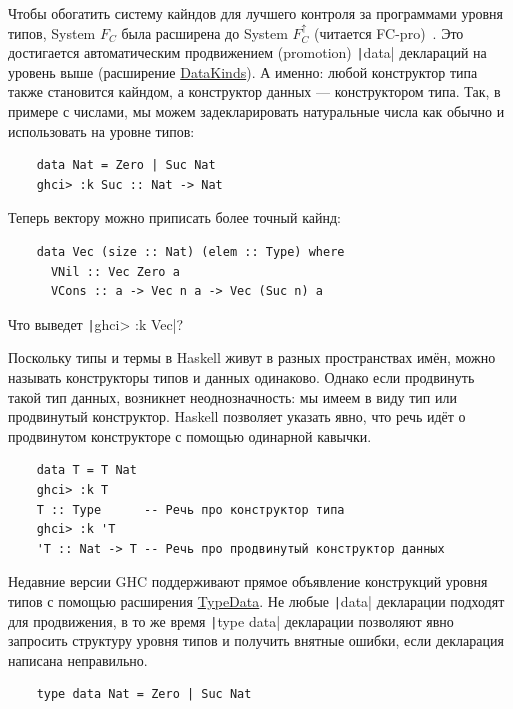 Чтобы обогатить систему кайндов для лучшего контроля за программами уровня типов, System $F_C$ была расширена до System $F_C^\uparrow$ (читается FC-pro)~\cite{yorgey2012giving}.
Это достигается автоматическим продвижением (promotion) \texttt|data| деклараций на уровень выше (расширение \href{https://downloads.haskell.org/ghc/latest/docs/users_guide/exts/data_kinds.html#extension-DataKinds}{DataKinds}).
А именно: любой конструктор типа также становится кайндом, а конструктор данных --- конструктором типа.
Так, в примере с числами, мы можем задекларировать натуральные числа как обычно и использовать на уровне типов:
\begin{verbatim}
    data Nat = Zero | Suc Nat
    ghci> :k Suc :: Nat -> Nat
\end{verbatim}

Теперь вектору можно приписать более точный кайнд:
\begin{verbatim}
    data Vec (size :: Nat) (elem :: Type) where
      VNil :: Vec Zero a
      VCons :: a -> Vec n a -> Vec (Suc n) a
\end{verbatim}

\begin{task}
    Что выведет \texttt|ghci> :k Vec|?
\end{task}

Поскольку типы и термы в Haskell живут в разных пространствах имён, можно называть конструкторы типов и данных одинаково.
Однако если продвинуть такой тип данных, возникнет неоднозначность: мы имеем в виду тип или продвинутый конструктор.
Haskell позволяет указать явно, что речь идёт о продвинутом конструкторе с помощью одинарной кавычки.
\begin{verbatim}
    data T = T Nat
    ghci> :k T
    T :: Type      -- Речь про конструктор типа
    ghci> :k 'T
    'T :: Nat -> T -- Речь про продвинутый конструктор данных
\end{verbatim}

Недавние версии GHC поддерживают прямое объявление конструкций уровня типов с помощью расширения \href{https://downloads.haskell.org/ghc/latest/docs/users_guide/exts/type_data.html#extension-TypeData}{TypeData}.
Не любые \texttt|data| декларации подходят для продвижения, в то же время \texttt|type data| декларации позволяют явно запросить структуру уровня типов и получить внятные ошибки, если декларация написана неправильно.
\begin{verbatim}
    type data Nat = Zero | Suc Nat
\end{verbatim}

